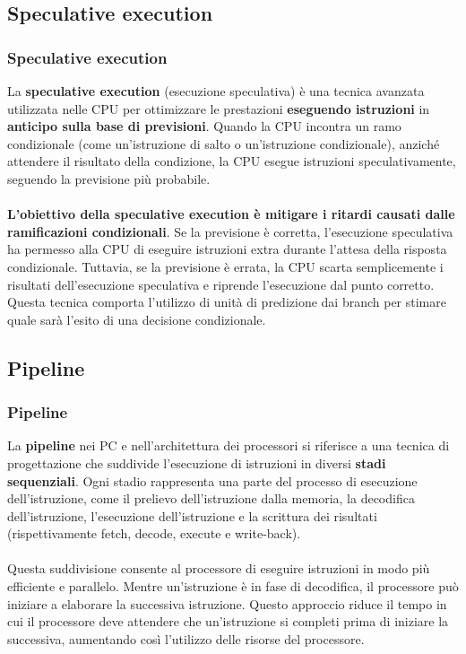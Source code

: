 \subsection[Speculative execution]{Speculative execution}
\begin{frame}
	\frametitle{ Speculative execution}

		La \textbf{speculative execution} (esecuzione speculativa) è una tecnica avanzata utilizzata nelle CPU per ottimizzare le prestazioni \textbf{eseguendo istruzioni} in \textbf{anticipo sulla base di previsioni}. Quando la CPU incontra un ramo condizionale (come un'istruzione di salto o un'istruzione condizionale), anziché attendere il risultato della condizione, la CPU esegue istruzioni speculativamente, seguendo la previsione più probabile.\\~\\
		\textbf{L'obiettivo della speculative execution è mitigare i ritardi causati dalle ramificazioni condizionali}. Se la previsione è corretta, l'esecuzione speculativa ha permesso alla CPU di eseguire istruzioni extra durante l'attesa della risposta condizionale. Tuttavia, se la previsione è errata, la CPU scarta semplicemente i risultati dell'esecuzione speculativa e riprende l'esecuzione dal punto corretto.\\
		Questa tecnica comporta l'utilizzo di unità di predizione dai branch per stimare quale sarà l'esito di una decisione condizionale.

\end{frame}


\subsection[Pipeline]{Pipeline}
\begin{frame}
	\frametitle{ Pipeline}

		La \textbf{pipeline} nei PC e nell'architettura dei processori si riferisce a una tecnica di progettazione che suddivide l'esecuzione di istruzioni in diversi \textbf{stadi sequenziali}. Ogni stadio rappresenta una parte del processo di esecuzione dell'istruzione, come il prelievo dell'istruzione dalla memoria, la decodifica dell'istruzione, l'esecuzione dell'istruzione e la scrittura dei risultati (rispettivamente fetch, decode, execute e write-back).\\~\\
		Questa suddivisione consente al processore di eseguire istruzioni in modo più efficiente e parallelo. Mentre un'istruzione è in fase di decodifica, il processore può iniziare a elaborare la successiva istruzione. Questo approccio riduce il tempo in cui il processore deve attendere che un'istruzione si completi prima di iniziare la successiva, aumentando così l'utilizzo delle risorse del processore.

\end{frame}



